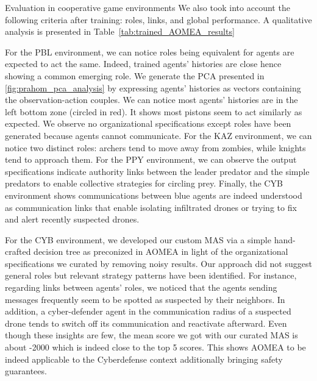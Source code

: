 \begin{frame}{Evaluation in cooperative game environments}
    We also took into account the following criteria after training: roles, links, and global performance. A qualitative analysis is presented in Table~\ref{tab:trained_AOMEA_results}
    
    For the PBL environment, we can notice roles being equivalent for agents are expected to act the same. Indeed, trained agents' histories are close hence showing a common emerging role. We generate the PCA presented in \autoref{fig:prahom_pca_analysis} by expressing agents' histories as vectors containing the observation-action couples. We can notice most agents’ histories are in the left bottom zone (circled in red). It shows most pistons seem to act similarly as expected. We observe no organizational specifications except roles have been generated because agents cannot communicate. For the KAZ environment, we can notice two distinct roles: archers tend to move away from zombies, while knights tend to approach them. For the PPY environment, we can observe the output specifications indicate authority links between the leader predator and the simple predators to enable collective strategies for circling prey. Finally, the CYB environment shows communications between blue agents are indeed understood as communication links that enable isolating infiltrated drones or trying to fix and alert recently suspected drones.

    For the CYB environment, we developed our custom MAS via a simple hand-crafted decision tree as preconized in AOMEA in light of the organizational specifications we curated by removing noisy results. Our approach did not suggest general roles but relevant strategy patterns have been identified. For instance, regarding links between agents' roles, we noticed that the agents sending messages frequently seem to be spotted as suspected by their neighbors. In addition, a cyber-defender agent in the communication radius of a suspected drone tends to switch off its communication and reactivate afterward. Even though these insights are few, the mean score we got with our curated MAS is about -2000 which is indeed close to the top 5 scores. This shows AOMEA to be indeed applicable to the Cyberdefense context additionally bringing safety guarantees.


\end{frame}
